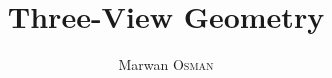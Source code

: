 \documentclass[a4paper,11pt]{article}
\title{Three-View Geometry}
\author{Marwan \textsc{Osman}}
\date{}
\begin{document}
\maketitle





\nocite{*}

\end{document}
